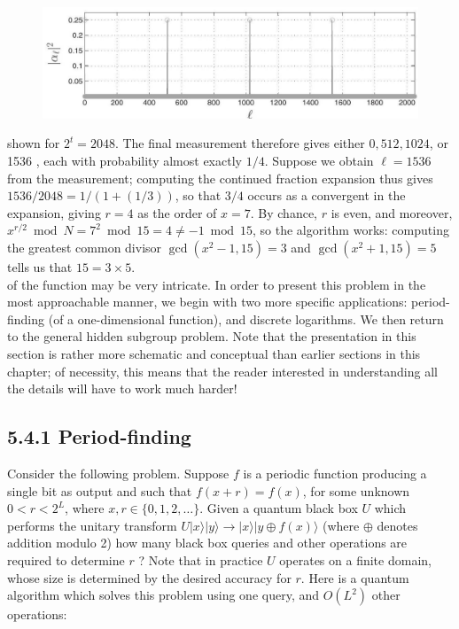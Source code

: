 \begin{figure}
\centering
\includegraphics[width=0.75\linewidth]{Images/2024_05_17_6977ce60de6fd27aef98g-269}
\end{figure}

shown for $2^{t}=2048$. The final measurement therefore gives either $0,512,1024$, or 1536 , each with probability almost exactly $1 / 4$. Suppose we obtain $\ell=1536$ from the measurement; computing the continued fraction expansion thus gives $1536 / 2048=1 /(1+(1 / 3))$, so that $3 / 4$ occurs as a convergent in the expansion, giving $r=4$ as the order of $x=7$. By chance, $r$ is even, and moreover, $x^{r / 2} \bmod N=7^{2} \bmod 15=4 \neq-1 \bmod 15$, so the algorithm works: computing the greatest common divisor $\operatorname{gcd}\left(x^{2}-1,15\right)=3$ and $\operatorname{gcd}\left(x^{2}+1,15\right)=5$ tells us that $15=3 \times 5$.\\
of the function may be very intricate. In order to present this problem in the most approachable manner, we begin with two more specific applications: period-finding (of a one-dimensional function), and discrete logarithms. We then return to the general hidden subgroup problem. Note that the presentation in this section is rather more schematic and conceptual than earlier sections in this chapter; of necessity, this means that the reader interested in understanding all the details will have to work much harder!

\subsection{5.4.1 Period-finding}
Consider the following problem. Suppose $f$ is a periodic function producing a single bit as output and such that $f(x+r)=f(x)$, for some unknown $0<r<2^{L}$, where $x, r \in\{0,1,2, \ldots\}$. Given a quantum black box $U$ which performs the unitary transform $U|x\rangle|y\rangle \rightarrow|x\rangle|y \oplus f(x)\rangle$ (where $\oplus$ denotes addition modulo 2) how many black box queries and other operations are required to determine $r$ ? Note that in practice $U$ operates on a finite domain, whose size is determined by the desired accuracy for $r$. Here is a quantum algorithm which solves this problem using one query, and $O\left(L^{2}\right)$ other operations:

